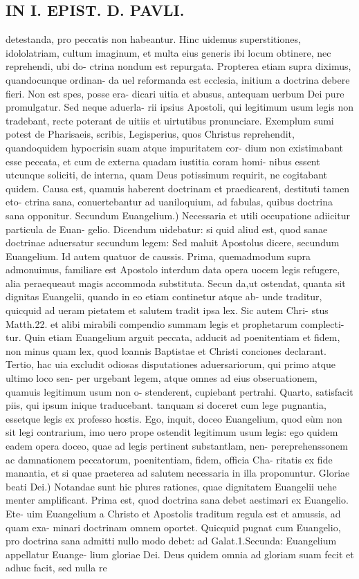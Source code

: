 \documentclass{article}
\begin{document}
\begin{pages}
\section*{IN I. EPIST. D. PAVLI. }
\marginpar{[ p.29 ]}\pstart detestanda, pro peccatis non habeantur. Hinc uidemus superstitiones, idololatriam, cultum imaginum, et multa eius generis ibi locum obtinere, nec reprehendi, ubi do- ctrina nondum est repurgata. Propterea etiam supra diximus, quandocunque  ordinan- da uel reformanda est ecclesia, initium a doctrina debere fieri. Non est spes, posse era- dicari uitia et abusus, antequam uerbum Dei pure promulgatur. Sed neque aduerla- rii ipsius Apostoli, qui legitimum usum legis non tradebant, recte poterant de uitiis et uirtutibus pronunciare. Exemplum sumi potest de Pharisaeis, scribis, Legisperius, quos Christus reprehendit, quandoquidem hypocrisin suam atque impuritatem cor- dium non existimabant esse peccata, et cum de externa quadam iustitia coram homi- nibus essent utcunque  soliciti, de interna, quam Deus potissimum requirit, ne cogitabant quidem. Causa est, quamuis haberent doctrinam et praedicarent, destituti tamen eto- ctrina sana, conuertebantur ad uaniloquium, ad fabulas, quibus doctrina sana opponitur.  \pend\pstart Secundum Euangelium.) Necessaria et utili occupatione adiicitur particula de Euan- gelio. Dicendum uidebatur: si quid aliud est, quod sanae doctrinae aduersatur secundum legem: Sed maluit Apostolus dicere, secundum Euangelium. Id autem quatuor de caussis. Prima, quemadmodum supra admonuimus, familiare est Apostolo interdum data opera uocem legis refugere, alia peraequeaut magis accommoda substituta. Secun da,ut ostendat, quanta sit dignitas Euangelii, quando in eo etiam continetur atque  ab- unde traditur, quicquid ad ueram pietatem et salutem tradit ipsa lex. Sic autem Chri- stus Matth.22. et alibi mirabili compendio summam legis et prophetarum complecti- tur. Quin etiam Euangelium arguit peccata, adducit ad poenitentiam et fidem, non minus quam lex, quod loannis Baptistae et Christi conciones declarant. Tertio, hac uia excludit odiosas disputationes aduersariorum, qui primo atque ultimo loco sen- per urgebant legem, atque omnes ad eius obseruationem, quamuis legitimum usum non o- stenderent, cupiebant pertrahi. Quarto, satisfacit piis, qui ipsum inique traducebant. tanquam si doceret cum lege pugnantia, essetque  legis ex professo hostis. Ego, inquit, doceo Euangelium, quod eùm non sit legi contrarium, imo uero prope ostendit legitimum usum legis: ego quidem eadem opera doceo, quae ad legis pertinent substantlam, nen- pereprehenssonem ac damnationem peccatorum, poenitentiam, fidem, officia Cha- ritatis ex fide manantia, et si quae praeterea ad salutem necessaria in illa proponuntur.  \pend\pstart Gloriae beati Dei.) Notandae sunt hic plures rationes, quae dignitatem Euangelii uehe menter amplificant. Prima est, quod doctrina sana debet aestimari ex Euangelio. Ete- uim Euangelium a Christo et Apostolis traditum regula est et amussis, ad quam exa- minari doctrinam omnem oportet. Quicquid pugnat cum Euangelio, pro doctrina sana admitti nullo modo debet: ad Galat.1.Secunda: Euangelium appellatur Euange- lium gloriae Dei. Deus quidem omnia ad gloriam suam fecit et adhuc facit, sed nulla re 
\end{pages}
\end{document}
